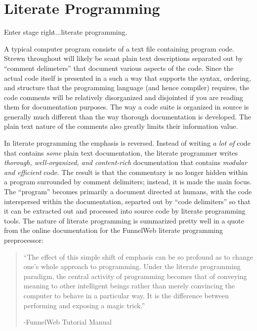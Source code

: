 \section{Literate Programming}
Enter stage right...literate programming. 

A typical computer program consists of a text file 
containing program code. Strewn throughout will likely be scant plain text descriptions separated out by 
``comment delimeters'' that document various aspects of the code.
Since the actual code itself is presented in a such a way that supports the syntax, ordering, and structure 
that the programming language (and hence compiler) requires, the code comments will
be relatively disorganized and disjointed if you are reading them for documentation purposes. 
The way a code suite is organized in source is generally much different than the way thorough documentation is 
developed. The plain text nature of the comments also greatly limits their information value.

In literate programming the emphasis is reversed. Instead of writing \textit{a lot of} code that contains 
\textit{some} plain text documentation, 
the literate programmer writes \textit{thorough, well-organized, and content-rich} documentation that contains 
\textit{modular and efficient} code. 
The result is that the commentary is no longer hidden within a program surrounded by 
comment delimiters; instead, it is made the main focus. 
The ``program'' becomes primarily a document directed at humans, with the 
code interspersed within the documentation, separted out by ``code delimiters'' so that it can be extracted 
out and processed into source code by literate programming tools. The nature of literate programming is 
summarized pretty well in a quote from the online documentation for the FunnelWeb literate programming
preprocessor:

\begin{quote}
``The effect of this simple shift of emphasis can be so profound as to change one's whole approach to
programming. Under the literate programming paradigm, the central activity of programming becomes that of 
conveying meaning to other intelligent beings rather than merely convincing the computer to behave in a 
particular way. It is the difference between performing and exposing a magic trick.'' 
\begin{flushright}
-FunnelWeb Tutorial Manual\cite{funnelweb-what-is-literate-programming}
\end{flushright}
\end{quote}


